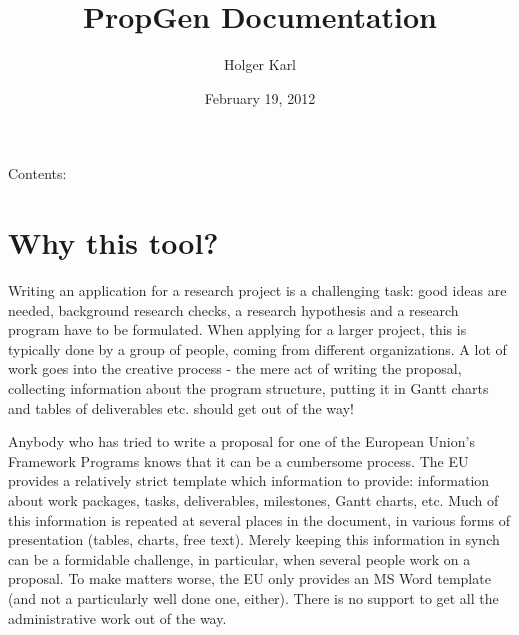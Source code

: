\documentclass[a4paper,10pt,english]{sphinxmanual}
\title{PropGen Documentation}
\date{February 19, 2012}
\author{Holger Karl}
\begin{document}
\maketitle
\tableofcontents
{}\label{index::doc}


Contents:


\chapter{Why this tool?}
\label{motivation::doc}\label{motivation:welcome-to-propgen-s-documentation}\label{motivation:why-this-tool}
Writing an application for a research project is a challenging task: good ideas are needed, background research checks, a research hypothesis and a research program have to be formulated. When applying for a larger project, this is typically done by a group of people, coming from different organizations. A lot of work goes into the creative process - the mere act of writing the proposal, collecting information about the program structure, putting it in Gantt charts and tables of deliverables etc. should get out of the way!

Anybody who has tried to write a proposal for one of the European Union's Framework Programs knows that it can be a cumbersome process. The EU provides a relatively strict template which information to provide: information about work packages, tasks, deliverables, milestones, Gantt charts, etc. Much of this information is repeated at several places in the document, in various forms of presentation (tables, charts, free text). Merely keeping this information in synch can be a formidable challenge, in particular, when several people work on a proposal. To make matters worse, the EU only provides an MS Word template (and not a particularly well done one, either). There is no support to get all the administrative work out of the way.
\end{document}
